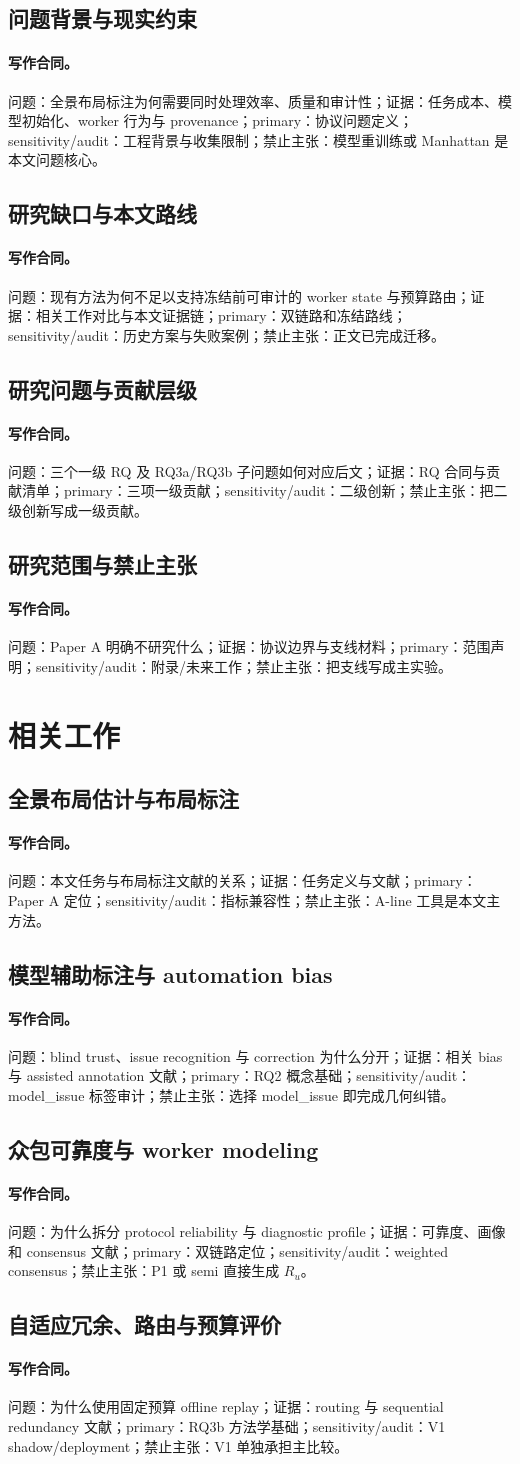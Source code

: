 \documentclass[UTF8,a4paper,12pt]{ctexart}
\newcommand{\contract}[5]{\paragraph{写作合同。}问题：#1；证据：#2；primary：#3；sensitivity/audit：#4；禁止主张：#5。}
\begin{document}
\subsection{问题背景与现实约束}
\contract{全景布局标注为何需要同时处理效率、质量和审计性}{任务成本、模型初始化、worker 行为与 provenance}{协议问题定义}{工程背景与收集限制}{模型重训练或 Manhattan 是本文问题核心}
\subsection{研究缺口与本文路线}
\contract{现有方法为何不足以支持冻结前可审计的 worker state 与预算路由}{相关工作对比与本文证据链}{双链路和冻结路线}{历史方案与失败案例}{正文已完成迁移}
\subsection{研究问题与贡献层级}
\contract{三个一级 RQ 及 RQ3a/RQ3b 子问题如何对应后文}{RQ 合同与贡献清单}{三项一级贡献}{二级创新}{把二级创新写成一级贡献}
\subsection{研究范围与禁止主张}
\contract{Paper A 明确不研究什么}{协议边界与支线材料}{范围声明}{附录/未来工作}{把支线写成主实验}

\section{相关工作}
\subsection{全景布局估计与布局标注}
\contract{本文任务与布局标注文献的关系}{任务定义与文献}{Paper A 定位}{指标兼容性}{A-line 工具是本文主方法}
\subsection{模型辅助标注与 automation bias}
\contract{blind trust、issue recognition 与 correction 为什么分开}{相关 bias 与 assisted annotation 文献}{RQ2 概念基础}{model\_issue 标签审计}{选择 model\_issue 即完成几何纠错}
\subsection{众包可靠度与 worker modeling}
\contract{为什么拆分 protocol reliability 与 diagnostic profile}{可靠度、画像和 consensus 文献}{双链路定位}{weighted consensus}{P1 或 semi 直接生成 $R_u$}
\subsection{自适应冗余、路由与预算评价}
\contract{为什么使用固定预算 offline replay}{routing 与 sequential redundancy 文献}{RQ3b 方法学基础}{V1 shadow/deployment}{V1 单独承担主比较}
\end{document}
